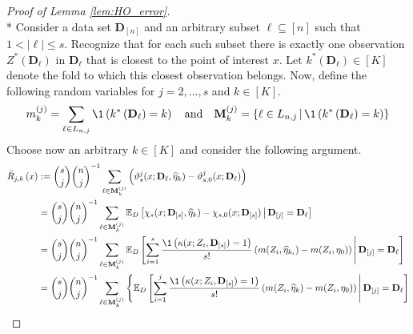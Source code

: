\begin{proof}[Proof of Lemma \ref{lem:HO_error}]\mbox{}\\*
    Consider a data set $\mathbf{D}_{[n]}$ and an arbitrary subset $\ell \subseteq [n]$ such that $1 < \left|\ell\right| \leq s$.
    Recognize that for each such subset there is exactly one observation $Z^{*}\left(\mathbf{D}_{\ell}\right)$ in $\mathbf{D}_{\ell}$ that is closest to the point of interest $x$.
    Let $k^{*}\left(\mathbf{D}_{\ell}\right) \in [K]$ denote the fold to which this closest observation belongs.
    Now, define the following random variables for $j = 2, \dotsc, s$ and $k \in [K]$.
    \begin{equation}
        m_{k}^{(j)}
        = \sum_{\ell \in L_{n,j}} \1\left(k^{*}\left(\mathbf{D}_{\ell}\right) = k\right) 
        \quad \text{and} \quad
        \mathbf{M}_{k}^{(j)}
        = \left\{\ell \in L_{n,j} \, \middle| \,  \1\left(k^{*}\left(\mathbf{D}_{\ell}\right) = k\right) \right\}
    \end{equation}
    Choose now an arbitrary $k \in [K]$ and consider the following argument.
    \begin{equation}
        \begin{aligned}
            \bar{R}_{j, k}\left(x\right) 
            & := \binom{s}{j}\binom{n}{j}^{-1} \sum_{\ell \in \mathbf{M}_{k}^{(j)}} \left(\vartheta_{s}^{j}(x; \mathbf{D}_{\ell}, \hat{\eta}_{k}) - \vartheta_{s,0}^{j}(x; \mathbf{D}_{\ell})\right) \\
            & = \binom{s}{j}\binom{n}{j}^{-1} \sum_{\ell \in \mathbf{M}_{k}^{(j)}} \E_{D}\left[\chi_{s}(x; \mathbf{D}_{[s]}, \hat{\eta}_{k}) - \chi_{s,0}(x; \mathbf{D}_{[s]}) \, \middle| \, \mathbf{D}_{[j]} = \mathbf{D}_{\ell}\right] \\
            & = \binom{s}{j}\binom{n}{j}^{-1} \sum_{\ell \in \mathbf{M}_{k}^{(j)}} \E_{D}\left[
                \sum_{i = 1}^{s}\frac{\1\left(\kappa(x; Z_{i}, \mathbf{D}_{[s]}) = 1\right)}{s!} \left(m(Z_{i}, \hat{\eta}_{k_i}) - m(Z_{i}, \eta_{0})\right)
            \, \middle| \, \mathbf{D}_{[j]} = \mathbf{D}_{\ell}\right] \\
            & = \binom{s}{j}\binom{n}{j}^{-1}  \sum_{\ell \in \mathbf{M}_{k}^{(j)}} \Bigg\{\E_{D}\left[
                \sum_{i = 1}^{j}\frac{\1\left(\kappa(x; Z_{i}, \mathbf{D}_{[s]}) = 1\right)}{s!} \left(m(Z_{i}, \hat{\eta}_{k}) - m(Z_{i}, \eta_{0})\right)
                \, \middle| \, \mathbf{D}_{[j]} = \mathbf{D}_{\ell}\right]\\

\end{aligned}
\end{equation}
\end{proof}
